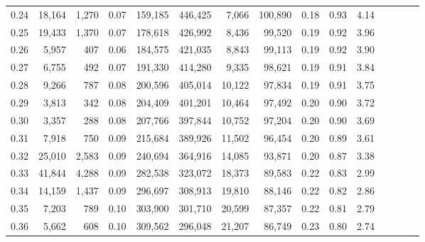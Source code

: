 \begin{tabular}{rrrcrrrrrrrrrrr}
0.24 &  18,164 &  1,270 &                                       0.07 &  159,185 &  446,425 &    7,066 &  100,890 &  0.18 &  0.93 &                         4.14 \\
0.25 &  19,433 &  1,370 &                                       0.07 &  178,618 &  426,992 &    8,436 &   99,520 &  0.19 &  0.92 &                         3.96 \\
0.26 &   5,957 &    407 &                                       0.06 &  184,575 &  421,035 &    8,843 &   99,113 &  0.19 &  0.92 &                         3.90 \\
0.27 &   6,755 &    492 &                                       0.07 &  191,330 &  414,280 &    9,335 &   98,621 &  0.19 &  0.91 &                         3.84 \\
0.28 &   9,266 &    787 &                                       0.08 &  200,596 &  405,014 &   10,122 &   97,834 &  0.19 &  0.91 &                         3.75 \\
0.29 &   3,813 &    342 &                                       0.08 &  204,409 &  401,201 &   10,464 &   97,492 &  0.20 &  0.90 &                         3.72 \\
0.30 &   3,357 &    288 &                                       0.08 &  207,766 &  397,844 &   10,752 &   97,204 &  0.20 &  0.90 &                         3.69 \\
0.31 &   7,918 &    750 &                                       0.09 &  215,684 &  389,926 &   11,502 &   96,454 &  0.20 &  0.89 &                         3.61 \\
0.32 &  25,010 &  2,583 &                                       0.09 &  240,694 &  364,916 &   14,085 &   93,871 &  0.20 &  0.87 &                         3.38 \\
0.33 &  41,844 &  4,288 &                                       0.09 &  282,538 &  323,072 &   18,373 &   89,583 &  0.22 &  0.83 &                         2.99 \\
0.34 &  14,159 &  1,437 &                                       0.09 &  296,697 &  308,913 &   19,810 &   88,146 &  0.22 &  0.82 &                         2.86 \\
0.35 &   7,203 &    789 &                                       0.10 &  303,900 &  301,710 &   20,599 &   87,357 &  0.22 &  0.81 &                         2.79 \\
0.36 &   5,662 &    608 &                                       0.10 &  309,562 &  296,048 &   21,207 &   86,749 &  0.23 &  0.80 &                         2.74 \\

\end{tabular}
